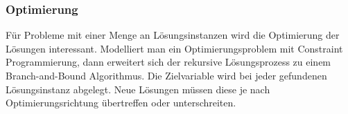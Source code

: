 \subsubsection{Optimierung}
Für Probleme mit einer Menge an Lösungsinstanzen wird die Optimierung der Lösungen interessant. Modelliert man ein Optimierungsproblem mit Constraint Programmierung, dann erweitert sich der rekursive Lösungsprozess zu einem Branch-and-Bound Algorithmus. Die Zielvariable wird bei jeder gefundenen Lösungsinstanz abgelegt. Neue Lösungen müssen diese je nach Optimierungsrichtung übertreffen oder unterschreiten.










